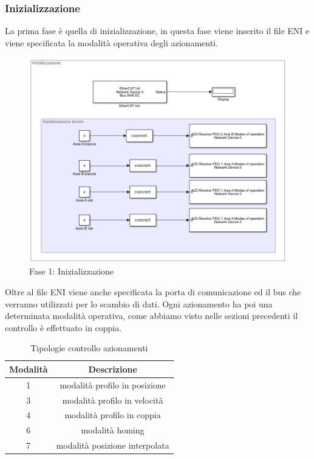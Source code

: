 \subsubsection*{Inizializzazione}
La prima fase è quella di inizializzazione, in questa fase viene inserito il file ENI e viene specificata la modalità operativa degli azionamenti.
\begin{figure}[ht]
	\begin{center}
		\includegraphics[scale=0.63]{Immagini/Sperimentale/Inizializzazione}
		\caption{Fase 1: Inizializzazione}
		\label{fig:Init}
	\end{center}
\end{figure}
Oltre al file ENI viene anche specificata la porta di comunicazione ed il bus che verranno utilizzati per lo scambio di dati. Ogni azionamento ha poi una determinata modalità operativa, come abbiamo visto nelle sezioni precedenti il controllo è effettuato in coppia. 
\begin{table}[h!]
	\centering
	\begin{tabular}{|c |c|} 
		\hline
		Modalità & Descrizione  \\ 
		\hline
		1 & modalità profilo in posizione  \\ 
		3 & modalità profilo in velocità  \\
		4 & modalità profilo in coppia   \\
		6 & modalità homing \\
		7 & modalità posizione interpolata\\
		\hline
	\end{tabular}
	\caption{Tipologie controllo azionamenti}
	\label{table:5}
\end{table}
